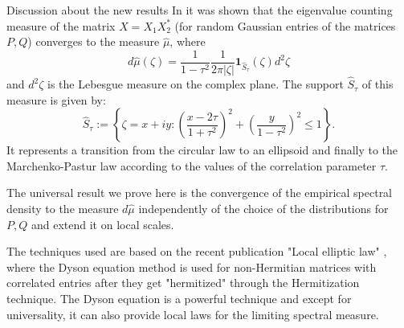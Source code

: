 \documentclass[11pt, a4paper, oneside]{book}
\numberwithin{equation}{chapter}
\begin{document}
\begin{section}{Discussion about the new results}
In \cite{akemann2021non} it was shown that the eigenvalue counting measure of the matrix $X=X_1 X_2^*$ (for random Gaussian entries of the matrices $P,Q$) converges to the measure $\hat{\mu}$, where
%
\begin{equation} \label{hatmeasure}
d\hat{\mu}(\zeta) = \frac{1}{1-\tau^2} \frac{1}{ 2 \pi |\zeta|} \mathbf{1}_{\hat{S}_{\tau}}(\zeta) d^2\zeta
\end{equation}
%
and $d^2 \zeta$ is the Lebesgue measure on the complex plane. The support $\widehat{S}_{\tau}$ of this measure is given by:
%
\begin{equation} \label{hatsupport}
\hat{S}_{\tau} := \left \{ \zeta = x+iy : \left ( \frac{ x - 2\tau}{1+\tau^2  } \right )^2 + \left ( \frac{y}{1-\tau^2 } \right )^2 \leq 1 \right \}.
\end{equation}
%
It represents a transition from the circular law to an ellipsoid and finally to the Marchenko-Pastur law according to the values of the correlation parameter $\tau$.

The universal result we prove here is the convergence of the empirical spectral density to the measure $d\hat{\mu}$ independently of the choice of the distributions for $P,Q$ and extend it on local scales.

The techniques used are based on the recent publication "Local elliptic law" \cite{alt2022local}, where the Dyson equation method is used for non-Hermitian matrices with correlated entries after they get "hermitized" through the Hermitization technique. The Dyson equation is a powerful technique and except for universality, it can also provide local laws for the limiting spectral measure.


\end{section}
\end{document}

